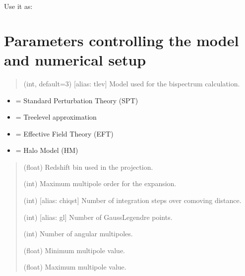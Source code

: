 \documentclass[letterpaper,10pt,english]{sphinxmanual}
\begin{document}
\sphinxAtStartPar
Use it as:

\begin{sphinxVerbatim}[commandchars=\\\{\}]
\end{sphinxVerbatim}


\section{Parameters controlling the model and numerical setup}
\label{\detokenize{params:parameters-controlling-the-model-and-numerical-setup}}\begin{quote}\begin{description}
\sphinxAtStartPar
(int, default=3) {[}alias: tlev{]} Model used for the bispectrum calculation.

\end{description}\end{quote}
\begin{itemize}
\item {} 
\sphinxAtStartPar
{} = Standard Perturbation Theory (SPT)

\item {} 
\sphinxAtStartPar
{} = Tree\sphinxhyphen{}level approximation

\item {} 
\sphinxAtStartPar
{} = Effective Field Theory (EFT)

\item {} 
\sphinxAtStartPar
{} = Halo Model (HM)

\end{itemize}
\begin{quote}\begin{description}
\sphinxAtStartPar
(float) Redshift bin used in the projection.

\sphinxAtStartPar
(int) Maximum multipole order for the expansion.

\sphinxAtStartPar
(int) {[}alias: chiqst{]} Number of integration steps over comoving distance.

\sphinxAtStartPar
(int) {[}alias: gl{]} Number of Gauss\textendash{}Legendre points.

\sphinxAtStartPar
(int) Number of angular multipoles.

\sphinxAtStartPar
(float) Minimum multipole value.

\sphinxAtStartPar
(float) Maximum multipole value.

\end{description}\end{quote}
\end{document}
